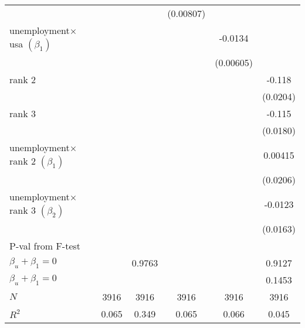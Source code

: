 \begin{table}[ht]
{\begin{tabular}{l*{5}{c}}
            &                     &                     &   (0.00807)         &                     &                     \\
[1em]
unemployment$\times$ usa  $\left( \beta_1 \right)$ &                     &                     &                     &     -0.0134\sym{*}  &                     \\
            &                     &                     &                     &   (0.00605)         &                     \\
[1em]
rank 2     &                     &                     &                     &                     &      -0.118\sym{***}\\
            &                     &                     &                     &                     &    (0.0204)         \\
[1em]
rank 3     &                     &                     &                     &                     &      -0.115\sym{***}\\
            &                     &                     &                     &                     &    (0.0180)         \\
[1em]
unemployment$\times$ rank 2  $\left( \beta_1 \right)$&                     &                     &                     &                     &     0.00415         \\
            &                     &                     &                     &                     &    (0.0206)         \\
[1em]
unemployment$\times$ rank 3  $\left( \beta_2 \right)$ &                     &                     &                     &                     &     -0.0123         \\
            &                     &                     &                     &                     &    (0.0163)         \\
\hline
P-val from F-test &\\
$\beta_u + \beta_1 = 0 $      &                 &        0.9763         &       {\color{red}{ 0.0814}}         &     {\color{red}{0.0186}}          &        0.9127         \\
$\beta_u + \beta_1 = 0 $       &                 &                &                 &                 &        0.1453         \\
\hline
\(N\)       &        3916         &        3916         &        3916         &        3916         &        3916         \\
\(R^{2}\)   &       0.065         &       0.349         &       0.065         &       0.066         &       0.045         \\

\end{tabular}}
\end{table}
